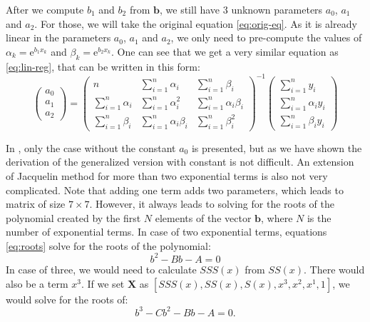 After we compute $b_1$ and $b_2$ from $\boldsymbol{b}$, we still have 3 unknown parameters $a_0$, $a_1$ and $a_2$. For those, we will take the original equation \ref{eq:orig-eq}. As it is already linear in the parameters $a_0$, $a_1$ and $a_2$, we only need to pre-compute the values of $\alpha_k=\mathrm{e}^{b_1x_k}$ and $\beta_k =\mathrm{e}^{b_2x_k}$.
One can see that we get a very similar equation as \ref{eq:lin-reg}, that can be written in this form:
\begin{equation}
	\begin{pmatrix}
		a_0 \\
		a_1 \\
		a_2
	\end{pmatrix} 
	=
	\begin{pmatrix}
		n & \sum\limits_{i=1}^n\alpha_i & \sum\limits_{i=1}^n\beta_i  \\
		\sum\limits_{i=1}^n\alpha_i & \sum\limits_{i=1}^n\alpha_i^2 & \sum\limits_{i=1}^n\alpha_i\beta_i  \\
		\sum\limits_{i=1}^n\beta_i & \sum\limits_{i=1}^n\alpha_i\beta_i & \sum\limits_{i=1}^n\beta_i^2
	\end{pmatrix}^{-1}
	\begin{pmatrix}
		\sum\limits_{i=1}^ny_i \\
		\sum\limits_{i=1}^n\alpha_iy_i \\
		\sum\limits_{i=1}^n\beta_iy_i
	\end{pmatrix}
\end{equation}

In \cite{jacquelin}, only the case without the constant $a_0$ is presented, but as we have shown the derivation of the generalized version with constant is not difficult. An extension of Jacquelin method for more than two exponential terms is also not very complicated. Note that adding one term adds two parameters, which leads to matrix of size $7\times7$. However, it always leads to solving for the roots of the polynomial created by the first $N$ elements of the vector $\boldsymbol{b}$, where $N$ is the number of exponential terms. In case of two exponential terms, equations \ref{eq:roots} solve for the roots of the polynomial:
\begin{equation}
	b^2-Bb-A=0
\end{equation}
In case of three, we would need to calculate $SSS(x)$ from $SS(x)$. There would also be a term $x^3$. If we set $\boldsymbol{X}$ as $\left[SSS(x),SS(x),S(x),x^3,x^2,x^1,1\right]$, we would solve for the roots of:
\begin{equation}
	b^3-Cb^2-Bb-A=0.
\end{equation}



